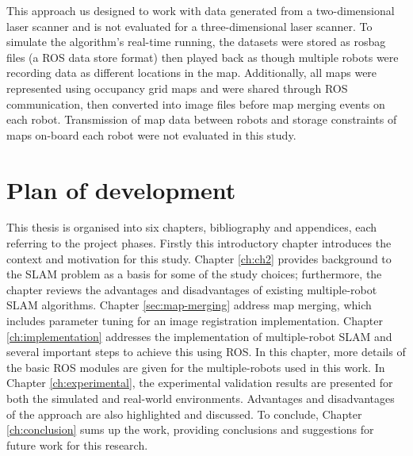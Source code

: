This approach us designed to work with data generated from a two-dimensional laser scanner and is not evaluated for a three-dimensional laser scanner. To simulate the algorithm's real-time running, the datasets were stored as rosbag files (a ROS data store format) then played back as though multiple robots were recording data as different locations in the map. Additionally, all maps were represented using occupancy grid maps and were shared through ROS communication, then converted into image files before map merging events on each robot. Transmission of map data between robots and storage constraints of maps on-board each robot were not evaluated in this study. 

\section{Plan of development}
\label{sec:ch1.section5}
This thesis is organised into six chapters, bibliography and appendices, each referring to the project phases. Firstly this introductory chapter introduces the context and motivation for this study. Chapter \ref{ch:ch2} provides background to the SLAM problem as a basis for some of the study choices; furthermore, the chapter reviews the advantages and disadvantages of existing multiple-robot SLAM algorithms. Chapter \ref{sec:map-merging} address map merging, which includes parameter tuning for an image registration implementation. Chapter \ref{ch:implementation} addresses the implementation of multiple-robot SLAM and several important steps to achieve this using ROS. In this chapter, more details of the basic ROS modules are given for the multiple-robots used in this work.  In Chapter \ref{ch:experimental}, the experimental validation results are presented for both the simulated and real-world environments. Advantages and disadvantages of the approach are also highlighted and discussed. To conclude, Chapter \ref{ch:conclusion} sums up the work, providing conclusions and suggestions for future work for this research.
